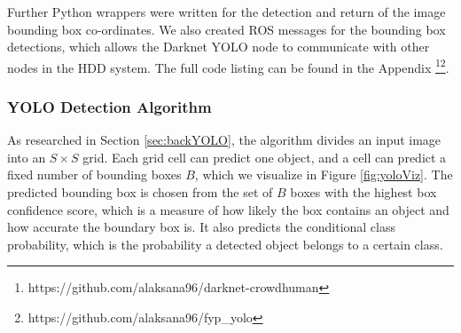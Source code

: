 Further Python wrappers were written for the detection and return of the image bounding box co-ordinates. We also created ROS messages for the bounding box detections, which allows the Darknet YOLO node to communicate with other nodes in the HDD system. The full code listing can be found in the Appendix \footnote{https://github.com/alaksana96/darknet-crowdhuman}\footnote{https://github.com/alaksana96/fyp\_yolo}.

\subsubsection{YOLO Detection Algorithm}
As researched in Section \ref{sec:backYOLO}, the algorithm divides an input image into an $S\times S$ grid. Each grid cell can predict one object, and a cell can predict a fixed number of bounding boxes $B$, which we visualize in Figure \ref{fig:yoloViz}. The predicted bounding box is chosen from the set of $B$ boxes with the highest box confidence score, which is a measure of how likely the box contains an object and how accurate the boundary box is. It also predicts the conditional class probability, which is the probability a detected object belongs to a certain class. 

